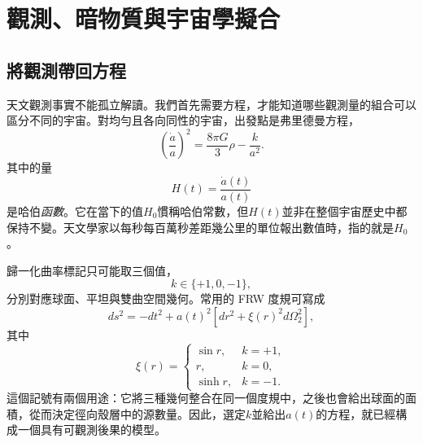 \chapter{觀測、暗物質與宇宙學擬合}


\section{將觀測帶回方程}

天文觀測事實不能孤立解讀。我們首先需要方程，才能知道哪些觀測量的組合可以區分不同的宇宙。對均勻且各向同性的宇宙，出發點是弗里德曼方程，
\begin{equation}
\left(\frac{\dot a}{a}\right)^2
=
\frac{8\pi G}{3}\rho-\frac{k}{a^2}.
\label{eq:c06-friedmann}
\end{equation}
其中的量
\begin{equation}
H(t)=\frac{\dot a(t)}{a(t)}
\label{eq:c06-hubble}
\end{equation}
是哈伯\emph{函數}。它在當下的值\(H_0\)慣稱哈伯常數，但\(H(t)\)並非在整個宇宙歷史中都保持不變。天文學家以每秒每百萬秒差距幾公里的單位報出數值時，指的就是\(H_0\)。

歸一化曲率標記只可能取三個值，
\begin{equation}
k\in\{+1,0,-1\},
\end{equation}
分別對應球面、平坦與雙曲空間幾何。常用的 FRW 度規可寫成
\begin{equation}
ds^2=-dt^2+a(t)^2\left[dr^2+\xi(r)^2d\Omega_2^2\right],
\label{eq:c06-frw}
\end{equation}
其中
\begin{equation}
\xi(r)=
\begin{cases}
\sin r, & k=+1,\\
r, & k=0,\\
\sinh r, & k=-1.
\end{cases}
\label{eq:c06-xi}
\end{equation}
這個記號有兩個用途：它將三種幾何整合在同一個度規中，之後也會給出球面的面積，從而決定徑向殼層中的源數量。因此，選定\(k\)並給出\(a(t)\)的方程，就已經構成一個具有可觀測後果的模型。


